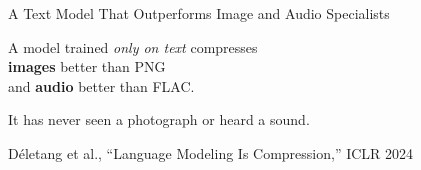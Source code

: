 \documentclass[aspectratio=169, 12pt]{beamer}
\begin{document}
\begin{frame}{A Text Model That Outperforms Image and Audio Specialists}
  \vspace{2em}
  \begin{center}
  \Large
  A model trained \emph{only on text} compresses\\
  \textbf{images} better than PNG\\
  and \textbf{audio} better than FLAC.
  \vspace{1.5em}

  \large
  It has never seen a photograph or heard a sound.
  \vspace{1.5em}

  \normalsize\color{anthblue!60}
  D\'{e}letang et al., ``Language Modeling Is Compression,'' ICLR 2024
  \end{center}
\end{frame}
\end{document}
